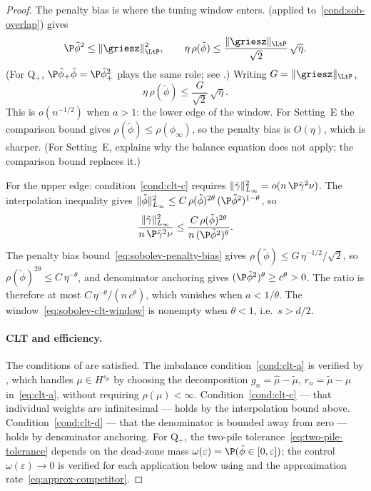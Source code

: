 \documentclass{article}
\begin{document}
\begin{proof}
The penalty bias is where
the tuning window enters.
(applied to~\ref{cond:sob-overlap})
gives
\begin{equation}\label{eq:sobolev-clt-balance}
\P\tilde\phi^2 \le \|\griesz\|_{\LtP}^2,
\qquad
\eta\,\rho(\tilde\phi) \le \frac{\|\griesz\|_{\LtP}}{\sqrt{2}}\,\sqrt{\eta}.
\end{equation}
(For Q$_+$, $\P\tilde\phi_+\tilde\phi
  = \P\tilde\phi_+^2$
plays the same role;
see .)
Writing $G = \|\griesz\|_{\LtP}$,
\begin{equation}\label{eq:sobolev-penalty-bias}
\eta\,\rho(\tilde\phi)
  \le \frac{G}{\sqrt{2}}\,\sqrt{\eta}.
\end{equation}
This is $o(n^{-1/2})$ when
$a > 1$:
the lower edge of the window.
For Setting~E
the comparison bound gives
$\rho(\tilde\phi) \le \rho(\phi_\infty)$,
so the penalty bias is $O(\eta)$,
which is sharper.
(For Setting~E,
 explains
why the balance equation does not apply;
the comparison bound replaces it.)

For the upper edge:
condition~\ref{cond:clt-c} requires
$\|\tilde\gamma\|_{L_\infty}^2
  = o(n\,\P\tilde\gamma^2\nu)$.
The interpolation inequality gives
$\|\tilde\phi\|_{L_\infty}^2
  \le C\,\rho(\tilde\phi)^{2\theta}\,
  (\P\tilde\phi^2)^{1-\theta}$,
so
\[
\frac{\|\tilde\gamma\|_{L_\infty}^2}
     {n\,\P\tilde\gamma^2\nu}
  \le \frac{C\,\rho(\tilde\phi)^{2\theta}}
           {n\,(\P\tilde\phi^2)^\theta}.
\]
The penalty bias bound~\eqref{eq:sobolev-penalty-bias}
gives $\rho(\tilde\phi)
  \le G\,\eta^{-1/2}/\sqrt{2}$,
so $\rho(\tilde\phi)^{2\theta}
  \le C\,\eta^{-\theta}$,
and denominator anchoring gives
$(\P\tilde\phi^2)^\theta \ge c^\theta > 0$.
The ratio is therefore at most
$C\,\eta^{-\theta}
  / (n\,c^\theta)$,
which vanishes when
$a < 1/\theta$.
The window~\eqref{eq:sobolev-clt-window}
is nonempty when $\theta < 1$,
i.e.\ $s > d/2$.

\paragraph{CLT and efficiency.}
The conditions of 
are satisfied.
The imbalance condition~\ref{cond:clt-a}
is verified by ,
which handles $\mu \in H^{s_\mu}$
by choosing the decomposition
$g_n = \hat\mu - \tilde\mu$,
$r_n = \tilde\mu - \mu$
in~\eqref{eq:clt-a},
without requiring $\rho(\mu) < \infty$.
Condition~\ref{cond:clt-c}
--- that individual weights
are infinitesimal ---
holds by the interpolation bound above.
Condition~\ref{cond:clt-d}
--- that the denominator is bounded away from zero ---
holds by denominator anchoring.
For Q$_+$,
the two-pile tolerance~\eqref{eq:two-pile-tolerance}
depends on the dead-zone mass
$\omega(\varepsilon) = \P(\tilde\phi \in [0,\varepsilon])$;
the control $\omega(\varepsilon) \to 0$
is verified for each application below
using 
and the approximation rate~\eqref{eq:approx-competitor}.


\end{proof}
\end{document}
